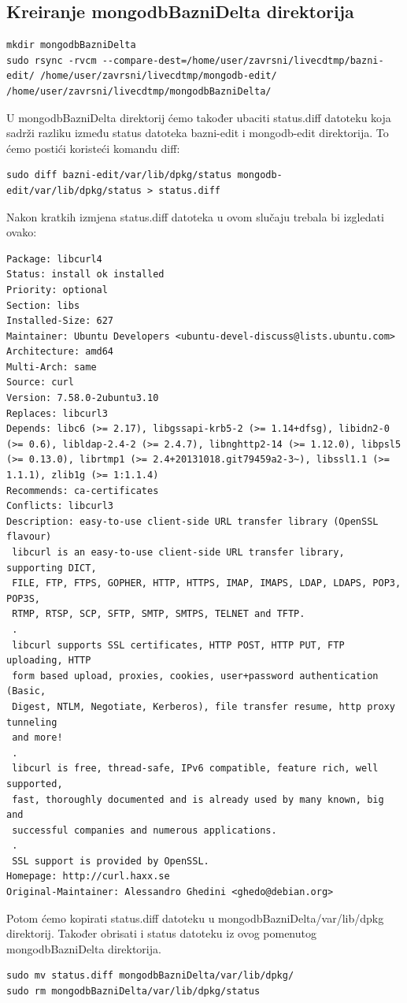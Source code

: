 \documentclass[12pt,vi]{mitthesis}
\begin{document}
\subsection*{Kreiranje mongodbBazniDelta direktorija}
\begin{lstlisting}[style=BashInputStyle]
mkdir mongodbBazniDelta
sudo rsync -rvcm --compare-dest=/home/user/zavrsni/livecdtmp/bazni-edit/ /home/user/zavrsni/livecdtmp/mongodb-edit/ /home/user/zavrsni/livecdtmp/mongodbBazniDelta/
\end{lstlisting}
\indent
U mongodbBazniDelta direktorij ćemo također ubaciti status.diff datoteku koja sadrži razliku između status datoteka bazni-edit i mongodb-edit direktorija. To ćemo postići koristeći komandu diff:
\begin{lstlisting}[style=BashInputStyle]
sudo diff bazni-edit/var/lib/dpkg/status mongodb-edit/var/lib/dpkg/status > status.diff
\end{lstlisting}
Nakon kratkih izmjena status.diff datoteka u ovom slučaju trebala bi izgledati ovako:
\begin{lstlisting}[style=BashInputStyle]
Package: libcurl4
Status: install ok installed
Priority: optional
Section: libs
Installed-Size: 627
Maintainer: Ubuntu Developers <ubuntu-devel-discuss@lists.ubuntu.com>
Architecture: amd64
Multi-Arch: same
Source: curl
Version: 7.58.0-2ubuntu3.10
Replaces: libcurl3
Depends: libc6 (>= 2.17), libgssapi-krb5-2 (>= 1.14+dfsg), libidn2-0 (>= 0.6), libldap-2.4-2 (>= 2.4.7), libnghttp2-14 (>= 1.12.0), libpsl5 (>= 0.13.0), librtmp1 (>= 2.4+20131018.git79459a2-3~), libssl1.1 (>= 1.1.1), zlib1g (>= 1:1.1.4)
Recommends: ca-certificates
Conflicts: libcurl3
Description: easy-to-use client-side URL transfer library (OpenSSL flavour)
 libcurl is an easy-to-use client-side URL transfer library, supporting DICT,
 FILE, FTP, FTPS, GOPHER, HTTP, HTTPS, IMAP, IMAPS, LDAP, LDAPS, POP3, POP3S,
 RTMP, RTSP, SCP, SFTP, SMTP, SMTPS, TELNET and TFTP.
 .
 libcurl supports SSL certificates, HTTP POST, HTTP PUT, FTP uploading, HTTP
 form based upload, proxies, cookies, user+password authentication (Basic,
 Digest, NTLM, Negotiate, Kerberos), file transfer resume, http proxy tunneling
 and more!
 .
 libcurl is free, thread-safe, IPv6 compatible, feature rich, well supported,
 fast, thoroughly documented and is already used by many known, big and
 successful companies and numerous applications.
 .
 SSL support is provided by OpenSSL.
Homepage: http://curl.haxx.se
Original-Maintainer: Alessandro Ghedini <ghedo@debian.org>
\end{lstlisting}
\indent
Potom ćemo kopirati status.diff datoteku u mongodbBazniDelta/var/lib/dpkg direktorij. Također obrisati i status datoteku iz ovog pomenutog mongodbBazniDelta direktorija.\\
\begin{lstlisting}[style=BashInputStyle]
sudo mv status.diff mongodbBazniDelta/var/lib/dpkg/
sudo rm mongodbBazniDelta/var/lib/dpkg/status
\end{lstlisting}
\end{document}
